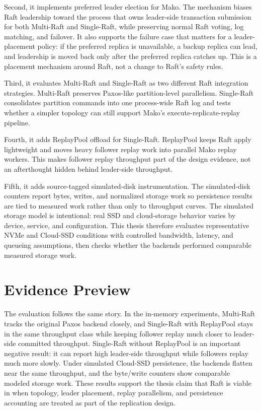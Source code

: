 Second, it implements preferred leader election for Mako. The mechanism biases
Raft leadership toward the process that owns leader-side transaction
submission for both Multi-Raft and Single-Raft, while preserving normal Raft
voting, log matching, and failover. It also supports the failure case that
matters for a leader-placement policy: if the preferred replica is unavailable,
a backup replica can lead, and leadership is moved back only after the preferred
replica catches up. This is a placement mechanism around Raft, not a change to
Raft's safety rules.

Third, it evaluates Multi-Raft and Single-Raft as two different Raft
integration strategies. Multi-Raft preserves Paxos-like partition-level
parallelism. Single-Raft consolidates partition commands into one process-wide
Raft log and tests whether a simpler topology can still support Mako's
execute-replicate-replay pipeline.

Fourth, it adds ReplayPool offload for Single-Raft. ReplayPool keeps Raft
apply lightweight and moves heavy follower replay work into parallel Mako
replay workers. This makes follower replay throughput part of the design
evidence, not an afterthought hidden behind leader-side throughput.

Fifth, it adds source-tagged simulated-disk instrumentation. The simulated-disk
counters report bytes, writes, and normalized storage work so persistence
results are tied to measured work rather than only to throughput curves. The
simulated storage model is intentional: real SSD and cloud-storage behavior
varies by device, service, and configuration. This thesis therefore evaluates
representative NVMe and Cloud-SSD conditions with controlled bandwidth,
latency, and queueing assumptions, then checks whether the backends performed
comparable measured storage work.

\section{Evidence Preview}

The evaluation follows the same story. In the in-memory experiments, Multi-Raft
tracks the original Paxos backend closely, and Single-Raft with ReplayPool
stays in the same throughput class while keeping follower replay much closer
to leader-side committed throughput. Single-Raft without ReplayPool is an
important negative result: it can report high leader-side throughput while
followers replay much more slowly. Under simulated Cloud-SSD persistence, the
backends flatten near the same throughput, and the byte/write counters show
comparable modeled storage work. These results support the thesis claim that
Raft is viable in \Mako{} when topology, leader placement, replay parallelism,
and persistence accounting are treated as part of the replication design.

